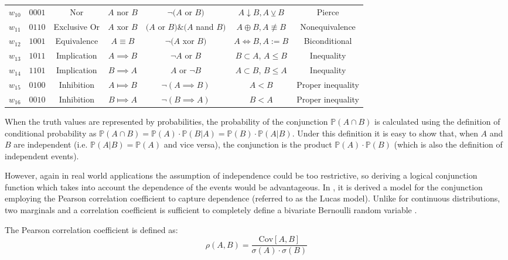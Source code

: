 \documentclass[runningheads]{llncs}
\begin{document}
\begin{table}[!h]
{\begin{tabular}{ |c|c|c|c|c|c|c| }
 $w_{10}$ & $0 0 0 1$ & Nor & $A$ nor $B$ & $\neg(A$ or $B)$ & $A \downarrow B, A \veebar B$  & Pierce\\ 
 $w_{11}$& $0 1 1 0$ & Exclusive Or  & $A$ xor $B$ & $(A$ or $B)\& (A$ nand $B)$ & $A \oplus B, A \not\equiv B$ & Nonequivalence\\ 
 $w_{12}$ & $1 0 0 1$ & Equivalence  & $A\equiv B$ &  $\neg (A$ xor $B)$ & $A \Leftrightarrow B, A := B$ & Biconditional\\ 
 $w_{13}$& $1 0 1 1$ & Implication & $A\implies B$ &  $\neg A$ or $B$ & $B \subset A$, $A \leq B$  & Inequality\\ 
 $w_{14}$ & $1 1 0 1$ & Implication &  $B \implies A$ &  $A$ or  $\neg B$ & $A \subset B$, $B \leq A$  & Inequality\\ 
 $w_{15}$&  $0 1 0 0$ &  Inhibition & $A \Longmapsto B$ &  $\neg (A \implies B)$ & $A < B$  & Proper inequality \\ 
 $w_{16}$ & $0 0 1 0$ &  Inhibition & $B \Longmapsto A$ & $\neg (B \implies A)$ &  $B < A$ & Proper inequality\\ 
 \hline
\end{tabular}}
\label{Tabel1}
\end{table}
%
When the truth values are represented by probabilities, the probability of the conjunction $\mathbb{P}(A \cap B)$ is calculated
using the definition of conditional probability as $\mathbb{P}(A \cap B) = \mathbb{P}(A) \cdot \mathbb{P}(B|A) = \mathbb{P}(B) \cdot \mathbb{P}(A|B)$.
Under this definition it is easy to show that, when $A$ and $B$ are independent (i.e. $\mathbb{P}(A|B) = \mathbb{P}(A)$ and vice versa), the
conjunction is the product $\mathbb{P}(A) \cdot \mathbb{P}(B)$ (which is also the definition of independent events).

However, again in real world applications the assumption of independence could be too restrictive, so deriving a logical
conjunction function which takes into account the dependence of the events would be advantageous.
In \cite{lucas1995default}, it is derived a model for the conjunction employing the Pearson correlation coefficient to capture dependence (referred to as the Lucas model). Unlike for continuous distributions, two marginals and a correlation coefficient is sufficient to completely define a bivariate Bernoulli random variable \cite{joe1997multivariate}.

The Pearson correlation coefficient is defined as:
\begin{equation}
\rho(A,B) = \frac{\text{Cov}[A,B]}{\sigma(A) \cdot \sigma(B)}
\end{equation}
\end{document}
